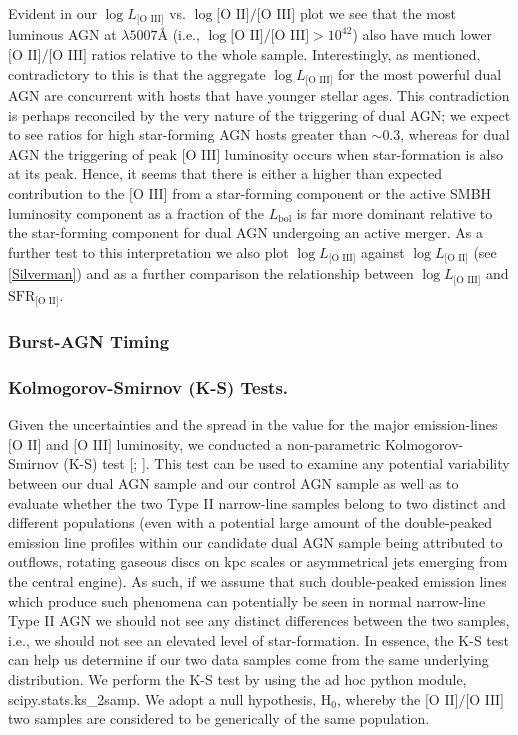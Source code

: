 Evident in our $\log{L_{\text{[O III]}}}$ vs. $\log{\text{[O II]}/\text{[O III]}}$ plot we see that the most luminous AGN at $\lambda5007Å$ (i.e., $\log{\text{[O II]}/\text{[O III]}}>{10^{42}}$) also have much lower $\text{[O II]}/\text{[O III]}$ ratios relative to the whole sample. Interestingly, as mentioned, contradictory to this is that the aggregate $\log{L_{\text{[O III]}}}$ for the most powerful dual AGN are concurrent with hosts that have younger stellar ages. This contradiction is perhaps reconciled by the very nature of the triggering of dual AGN; we expect to see ratios for high star-forming AGN hosts greater than $\sim{0.3}$, whereas for dual AGN the triggering of peak $\text{[O III]}$ luminosity occurs when star-formation is also at its peak. Hence, it seems that there is either a higher than expected contribution to the $\text{[O III]}$ from a star-forming component or the active SMBH luminosity component as a fraction of the $L_{\text{bol}}$ is far more dominant relative to the star-forming component for dual AGN undergoing an active merger. As a further test to this interpretation we also plot $\log{L_{\text{[O III]}}}$ against $\log{L_{\text{[O II]}}}$ (see \ref{Silverman}) and as a further comparison the relationship between $\log{L_{\text{[O III]}}}$ and $\text{SFR}_{\text{[O II]}}$.

\subsubsection{Burst-AGN Timing}


 
\subsubsection{Kolmogorov-Smirnov (K-S) Tests.}

Given the uncertainties and the spread in the value for the major emission-lines $\text{[O II]}$ and $\text{[O III]}$ luminosity, we conducted a non-parametric Kolmogorov-Smirnov (K-S) test [\cite{Peacock_1983}; \cite{Justel_1997}]. This test can be used to examine any potential variability between our dual AGN sample and our control AGN sample as well as to evaluate whether the two Type II narrow-line samples belong to two distinct and different populations (even with a potential large amount of the double-peaked emission line profiles within our candidate dual AGN sample being attributed to outflows, rotating gaseous discs on kpc scales or asymmetrical jets emerging from the central engine). As such, if we assume that such double-peaked emission lines which produce such phenomena can potentially be seen in normal narrow-line Type II AGN we should not see any distinct differences between the two samples, i.e., we should not see an elevated level of star-formation. In essence, the K-S test can help us determine if our two data samples come from the same underlying distribution. We perform the K-S test by using the ad hoc python module, scipy.stats.ks_2samp. We adopt a null hypothesis, $\text{H}_{0}$, whereby the $\text{[O II]}/\text{[O III]}$ two samples are considered to be generically of the same population.  

